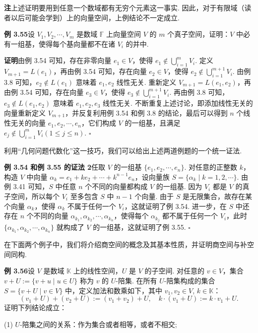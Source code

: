 \documentclass[UTF8,12pt,a4paper,fontset=fandol]{ctexart}
\begin{document}
\noindent\textbf{注}\quad 上述证明要用到任意一个数域都有无穷个元素这一事实. 因此，对于有限域（读者以后可能会学到）上的向量空间，上例结论不一定成立.

\noindent\textbf{例 3.55}\quad 设 $V_1,V_2,\cdots,V_m$ 是数域 $\mathbb{F}$ 上向量空间 $V$ 的 $m$ 个真子空间，证明：$V$ 中必有一组基，使得每个基向量都不在诸 $V_i$ 的并中.

\noindent\textbf{证明}\quad 由例 3.54 可知，存在非零向量 $e_1\in V$，使得 $e_1\notin\bigcup_{i=1}^m V_i$. 定义 $V_{m+1}=L(e_1)$，再由例 3.54 可知，存在向量 $e_2\in V$，使得 $e_2\notin\bigcup_{i=1}^{m+1}V_i$. 由例 3.8 可知，$e_2\notin L(e_1)$ 意味着 $e_1,e_2$ 线性无关. 重新定义 $V_{m+1}=L(e_1,e_2)$，再由例 3.54 可知，存在向量 $e_3\in V$，使得 $e_3\notin\bigcup_{i=1}^{m+1}V_i$. 再由例 3.8 可知，$e_3\notin L(e_1,e_2)$ 意味着 $e_1,e_2,e_3$ 线性无关. 不断重复上述讨论，即添加线性无关的向量重新定义 $V_{m+1}$，并反复利用例 3.54 和例 3.8 的结论，最后可以得到 $n$ 个线性无关的向量 $e_1,e_2,\cdots,e_n$，它们构成 $V$ 的一组基，且满足 $e_j\notin\bigcup_{i=1}^m V_i(1\le j\le n)$. $\square$

利用“几何问题代数化”这一技巧，我们可以给出上述两道例题的一个统一证法.

\noindent\textbf{例 3.54 和例 3.55 的证法 2}\quad 任取 $V$ 的一组基 $\{e_1,e_2,\cdots,e_n\}$. 对任意的正整数 $k$，构造 $V$ 中向量 $\alpha_k=e_1+ke_2+\cdots+k^{n-1}e_n$，设向量族 $S=\{\alpha_k\mid k=1,2,\cdots\}$. 由例 3.41 可知，$S$ 中任意 $n$ 个不同的向量都构成 $V$ 的一组基. 因为 $V_i$ 都是 $V$ 的真子空间，所以每个 $V_i$ 至多包含 $S$ 中 $n-1$ 个向量. 由于 $S$ 是无限集合，故存在某个向量 $\alpha_k$，使得 $\alpha_k$ 不属于任何一个 $V_i$，这就证明了例 3.54. 进一步，在 $S$ 中还存在 $n$ 个不同的向量 $\alpha_{k_1},\alpha_{k_2},\cdots,\alpha_{k_n}$，使得每个 $\alpha_{k_j}$ 都不属于任何一个 $V_i$，此时 $\{\alpha_{k_1},\alpha_{k_2},\cdots,\alpha_{k_n}\}$ 就构成了 $V$ 的一组基，这就证明了例 3.55. $\square$

在下面两个例子中，我们将介绍商空间的概念及其基本性质，并证明商空间与补空间同构.

\noindent\textbf{例 3.56}\quad 设 $V$ 是数域 $\mathbb{K}$ 上的线性空间，$U$ 是 $V$ 的子空间. 对任意的 $v\in V$，集合 $v+U:=\{v+u\mid u\in U\}$ 称为 $v$ 的 $U$-陪集. 在所有 $U$-陪集构成的集合 $S=\{v+U\mid v\in V\}$ 中，定义加法和数乘如下，其中 $v_1,v_2\in V$, $k\in\mathbb{K}$：
\[
(v_1+U)+(v_2+U):=(v_1+v_2)+U,\quad k\cdot(v_1+U):=k\cdot v_1+U.
\]
证明下列结论成立：

(1) $U$-陪集之间的关系：作为集合或者相等，或者不相交;
\end{document}
